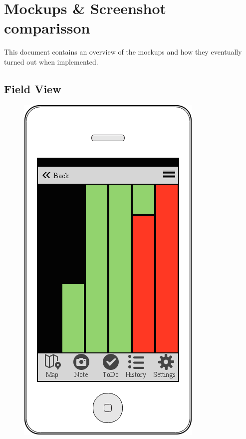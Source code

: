 \documentclass[12pt]{article}
\begin{document}
	\pagebreak

	\tableofcontents
	\clearpage

\section{Mockups \& Screenshot comparisson}
This document contains an overview of the mockups and how they eventually turned out when implemented.
\subsection{Field View}
\begin{figure}[ht]
	\centering
	\includegraphics[width=\linewidth, height=0.4\textheight, keepaspectratio=true]{screenshots/Grutto.png}

\end{figure}
\end{document}
